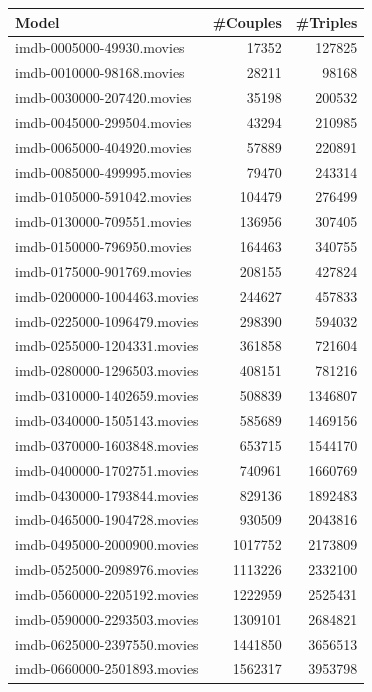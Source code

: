 \documentclass[a4paper,11pt]{article}
\begin{document}
\begin{table}[h!]
  \centering
  \begin{tabular}{| l | r | r |}
  \hline
  \textbf{Model}              & \textbf{\#Couples} & \textbf{\#Triples}\\
  \hline
  imdb-0005000-49930.movies   & 17352 & 127825\\
  imdb-0010000-98168.movies   & 28211 & 98168\\
  imdb-0030000-207420.movies  & 35198 & 200532\\
  imdb-0045000-299504.movies  & 43294 & 210985\\
  imdb-0065000-404920.movies  & 57889 & 220891\\
  imdb-0085000-499995.movies  & 79470 & 243314\\
  imdb-0105000-591042.movies  & 104479 & 276499\\
  imdb-0130000-709551.movies  & 136956 & 307405\\
  imdb-0150000-796950.movies  & 164463 & 340755\\
  imdb-0175000-901769.movies  & 208155 & 427824\\
  imdb-0200000-1004463.movies & 244627 & 457833\\
  imdb-0225000-1096479.movies & 298390 & 594032\\
  imdb-0255000-1204331.movies & 361858 & 721604\\
  imdb-0280000-1296503.movies & 408151 & 781216\\
  imdb-0310000-1402659.movies & 508839 & 1346807\\
  imdb-0340000-1505143.movies & 585689 & 1469156\\
  imdb-0370000-1603848.movies & 653715 & 1544170\\
  imdb-0400000-1702751.movies & 740961 & 1660769\\
  imdb-0430000-1793844.movies & 829136 & 1892483\\
  imdb-0465000-1904728.movies & 930509 & 2043816\\
  imdb-0495000-2000900.movies & 1017752 & 2173809\\
  imdb-0525000-2098976.movies & 1113226 & 2332100\\
  imdb-0560000-2205192.movies & 1222959 & 2525431\\
  imdb-0590000-2293503.movies & 1309101 & 2684821\\
  imdb-0625000-2397550.movies & 1441850 & 3656513\\
  imdb-0660000-2501893.movies & 1562317 & 3953798\\

\end{tabular}
\end{table}
\end{document}
